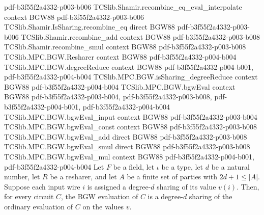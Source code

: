 \begin{theorem}
  {pdf-b3f55f2a4332-p003-b006}
\proofstep
  {TCSlib.Shamir.recombine_eq_eval_interpolate}
  {context}
  {BGW88}
  {pdf-b3f55f2a4332-p003-b006}
\proofstep
  {TCSlib.Shamir.IsSharing.recombine_eq}
  {direct}
  {BGW88}
  {pdf-b3f55f2a4332-p003-b006}
\proofstep
  {TCSlib.Shamir.recombine_add}
  {context}
  {BGW88}
  {pdf-b3f55f2a4332-p003-b008}
\proofstep
  {TCSlib.Shamir.recombine_smul}
  {context}
  {BGW88}
  {pdf-b3f55f2a4332-p003-b008}
\proofstep
  {TCSlib.MPC.BGW.Resharer}
  {context}
  {BGW88}
  {pdf-b3f55f2a4332-p004-b004}
\proofstep
  {TCSlib.MPC.BGW.degreeReduce}
  {context}
  {BGW88}
  {pdf-b3f55f2a4332-p004-b001,
    pdf-b3f55f2a4332-p004-b004}
\proofstep
  {TCSlib.MPC.BGW.isSharing_degreeReduce}
  {context}
  {BGW88}
  {pdf-b3f55f2a4332-p004-b004}
\proofstep
  {TCSlib.MPC.BGW.bgwEval}
  {context}
  {BGW88}
  {pdf-b3f55f2a4332-p003-b004,
    pdf-b3f55f2a4332-p003-b008,
    pdf-b3f55f2a4332-p004-b001,
    pdf-b3f55f2a4332-p004-b004}
\proofstep
  {TCSlib.MPC.BGW.bgwEval_input}
  {context}
  {BGW88}
  {pdf-b3f55f2a4332-p003-b004}
\proofstep
  {TCSlib.MPC.BGW.bgwEval_const}
  {context}
  {BGW88}
  {pdf-b3f55f2a4332-p003-b008}
\proofstep
  {TCSlib.MPC.BGW.bgwEval_add}
  {direct}
  {BGW88}
  {pdf-b3f55f2a4332-p003-b008}
\proofstep
  {TCSlib.MPC.BGW.bgwEval_smul}
  {direct}
  {BGW88}
  {pdf-b3f55f2a4332-p003-b008}
\proofstep
  {TCSlib.MPC.BGW.bgwEval_mul}
  {context}
  {BGW88}
  {pdf-b3f55f2a4332-p004-b001,
    pdf-b3f55f2a4332-p004-b004}
Let $F$ be a field, let $\iota$ be a type, let $d$ be a natural number, let $R$ be a
resharer, and let $A$ be a finite set of parties with $2d+1\le |A|$. Suppose each input
wire $i$ is assigned a degree-$d$ sharing of its value $v(i)$. Then, for every circuit
$C$, the BGW evaluation of $C$ is a degree-$d$ sharing of the ordinary evaluation of $C$
on the values $v$.
\end{theorem}

